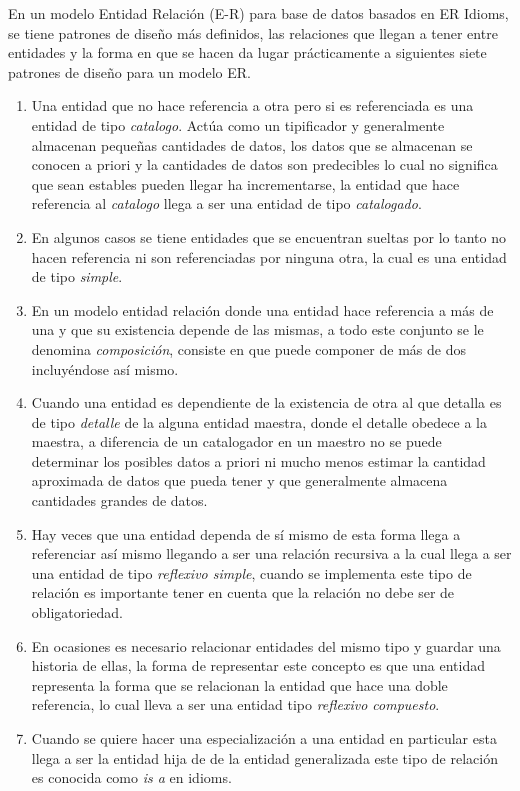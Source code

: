 En un modelo Entidad Relaci\'on (E-R) para base de datos basados en ER Idioms\cite{idioms}, se tiene patrones de dise\~no m\'as definidos, las relaciones que llegan a tener entre entidades y la forma en que se hacen da lugar pr\'acticamente a siguientes siete patrones de dise\~no para un modelo ER.
\begin{enumerate}
\item Una entidad que no hace referencia a otra pero si es referenciada es una entidad de tipo \textit{catalogo}. Act\'ua como un tipificador y generalmente almacenan peque\~nas cantidades de datos, los datos que se almacenan  se conocen a priori y la cantidades de datos son predecibles lo cual no significa que sean estables pueden llegar ha incrementarse, la entidad que hace referencia al \textit{catalogo} llega a ser una entidad de tipo \textit{catalogado}.
\item En algunos casos se tiene entidades que se encuentran sueltas por lo tanto no hacen referencia ni son referenciadas por ninguna otra, la cual es una entidad de tipo \textit{simple}.
\item En un modelo entidad relaci\'on donde una entidad hace referencia a m\'as de una y que su existencia depende de las mismas, a todo este conjunto se le denomina  \textit{composici\'on}, consiste en que puede componer de m\'as de dos incluy\'endose as\'i mismo.
\item
Cuando una entidad es dependiente de la existencia de otra al que detalla es de tipo \textit{detalle} de la alguna entidad maestra, donde el  detalle obedece a la maestra, a diferencia de un catalogador en un maestro no se puede determinar  los posibles datos a priori ni mucho menos estimar la cantidad aproximada de datos que pueda tener y que generalmente almacena cantidades grandes de datos.
\item
Hay veces que una entidad dependa de s\'i mismo de esta forma llega a referenciar as\'i mismo llegando a ser una relaci\'on recursiva a la cual llega a ser una entidad de tipo \textit{reflexivo simple}, cuando se implementa este tipo de relaci\'on es importante tener en cuenta que la relaci\'on no debe ser de obligatoriedad.
\item
En ocasiones es necesario relacionar entidades del mismo tipo y guardar una historia de ellas, la forma de representar este concepto es que una entidad representa la forma que se relacionan la entidad que hace una doble referencia, lo cual lleva a ser una entidad tipo  \textit{reflexivo compuesto}.
\item
Cuando se quiere hacer una especializaci\'on a una entidad en particular esta llega a ser la entidad hija de de la entidad generalizada este tipo de relaci\'on es conocida como \textit{is a} en idioms.
\end{enumerate}

